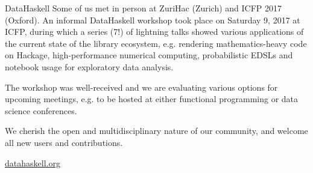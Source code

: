 \documentclass[DIV16,twocolumn,10pt]{scrreprt}
\begin{document}
\begin{hcarentry}{DataHaskell}
Some of us met in person at ZuriHac (Zurich) and ICFP 2017 (Oxford). An informal DataHaskell workshop took place on Saturday 9, 2017 at ICFP, during which a series (7!) of lightning talks showed various applications of the current state of the library ecosystem, e.g. rendering mathematics-heavy code on Hackage, high-performance numerical computing, probabilistic EDSLs and notebook usage for exploratory data analysis. 

The workshop was well-received and we are evaluating various options for upcoming meetings, e.g. to be hosted at either functional programming or data science conferences.



We cherish the open and multidisciplinary nature of our community, and welcome all new users and contributions.

\FurtherReading
  \url{datahaskell.org}
\end{hcarentry}
\end{document}
